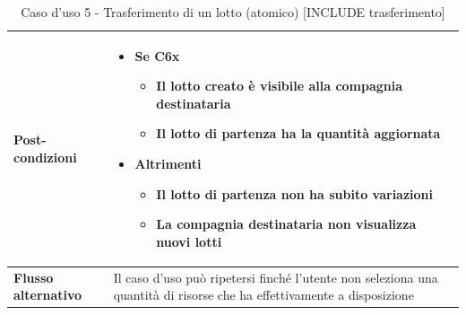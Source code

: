 \documentclass[a4paper,11pt]{article}
\begin{document}
\begin{table}[H]
\begin{tabular}{|m{2cm}|m{10.5cm}|}
    \\ \hline
    \multicolumn{1}{|l|}{\textbf{Post-condizioni}}    &
    \begin{itemize}
      \item Se C6x
            \begin{itemize}
              \item Il lotto creato è visibile alla compagnia destinataria
              \item Il lotto di partenza ha la quantità aggiornata
            \end{itemize}
      \item Altrimenti
            \begin{itemize}
              \item Il lotto di partenza non ha subito variazioni
              \item La compagnia destinataria non visualizza nuovi lotti
            \end{itemize}
    \end{itemize}
    \\ \hline
    \multicolumn{1}{|l|}{\textbf{Flusso alternativo}} &

    Il caso d'uso può ripetersi finché l'utente non seleziona una quantità di risorse che ha effettivamente a disposizione

    \\ \hline
  \end{tabular}
  \caption{Caso d'uso 5 - Trasferimento di un lotto (atomico) [INCLUDE trasferimento] }
  \label{cu:CU5}
\end{table}
\end{document}
